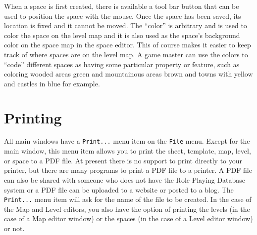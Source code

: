 When a space is first created, there is available a tool bar button that
can be used to position the space with the mouse.  Once the space has
been saved, its location is fixed and it cannot be moved.  The ``color'' is
arbitrary and is used to color the space on the level map and it is also
used as the space's background color on the space map in the space
editor.  This of course makes it easier to keep track of where spaces
are on the level map.  A game master can use the colors to ``code''
different spaces as having some particular property or feature, such as
coloring wooded areas green and mountainous areas brown and towns with
yellow and castles in blue for example.

\section{Printing}

All main windows have a \verb=Print...= menu item on the \verb=File=
menu. Except for the main window, this menu item allows you to print the
sheet, template, map, level, or space to a PDF file.  At present there
is no support to print directly to your printer, but there are many
programs to print a PDF file to a printer.  A PDF file can also be
shared with someone who does not have the Role Playing Database system
or a PDF file can be uploaded to a website or posted to a blog.  The
\verb=Print...= menu item will ask for the name of the file to be
created.  In the case of the Map and Level editors, you also have the
option of printing the levels (in the case of a Map editor window) or
the spaces (in the case of a Level editor window) or not.
